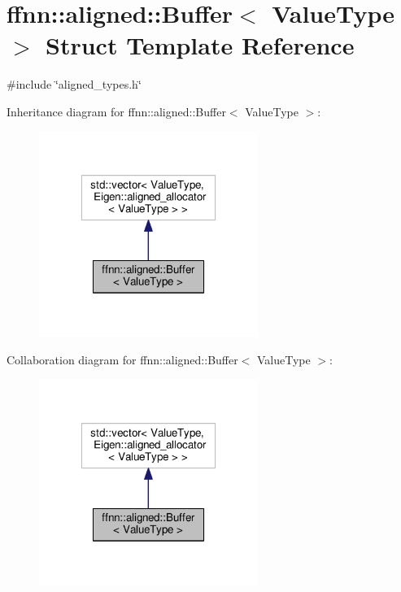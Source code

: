 \hypertarget{structffnn_1_1aligned_1_1_buffer}{\section{ffnn\-:\-:aligned\-:\-:Buffer$<$ Value\-Type $>$ Struct Template Reference}
\label{structffnn_1_1aligned_1_1_buffer}
}


{\ttfamily \#include \char`\"{}aligned\-\_\-types.\-h\char`\"{}}



Inheritance diagram for ffnn\-:\-:aligned\-:\-:Buffer$<$ Value\-Type $>$\-:\nopagebreak
\begin{figure}[H]
\begin{center}
\leavevmode
\includegraphics[width=202pt]{structffnn_1_1aligned_1_1_buffer__inherit__graph}
\end{center}
\end{figure}


Collaboration diagram for ffnn\-:\-:aligned\-:\-:Buffer$<$ Value\-Type $>$\-:\nopagebreak
\begin{figure}[H]
\begin{center}
\leavevmode
\includegraphics[width=202pt]{structffnn_1_1aligned_1_1_buffer__coll__graph}
\end{center}
\end{figure}

